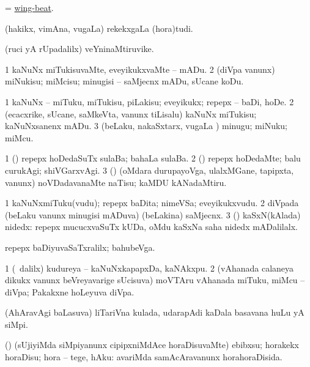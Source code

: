 \bentry
{}
\gl{\nA}
\bmng
= \hyperlink{wing-beat}{wing-beat}. 
\emng
\eentry

\bentry
{}
\gl{\nA}
\bmng
(hakikx, vimAna, \mo vugaLa) rekekxgaLa (hora)tudi. 
\emng
\eentry

\bentry
{}
\gl{\nA}
\bmng
(ruci yA rUpadalilx) veYninaMtiruvike. 
\emng
\eentry

\bentry
{} 
\gl{\sakirx}
\expl{}
\bmng
\bnum
\num{1} kaNuNx miTukisuvaMte, eveyikukxvaMte -- mADu. 
\num{2} (diVpa \mo vanunx) miNukisu; miMcisu; minugisi -- saMjecnx mADu, sUcane koDu. 
\enum
\emng

\noindent
\gl{\akirx}
\expl{}
\bmng
\bnum
\num{1} kaNuNx -- miTuku, miTukisu, piLakisu; eveyikukx; repepx -- baDi, hoDe. 
\num{2} (ecacxrike, sUcane, saMkeVta, \mo vanunx tiLisalu) kaNuNx miTukisu; kaNuNxsanenx mADu. 
\num{3} (beLaku, nakaSxtarx, \mo vugaLa \vi) minugu; miNuku; miMcu. 
\enum
\emng

\noindent
\gl{\pagu}
\expl{}
\bmng
\bnum
\num{1}  (\AmA) repepx hoDedaSuTx sulaBa; bahaLa sulaBa. 
\num{2}  (\ashi) repepx hoDedaMte; balu curukAgi; shiVGarxvAgi. 
\num{3}  (\rUpa) (oMdara durupayoVga, ulalxMGane, tapipxta, \mo vanunx) noVDadavanaMte naTisu; kaMDU kANadaMtiru. 
\enum
\emng
\eentry

\bentry
{}
\gl{\nA}
\expl{}
\bmng
\bnum
\num{1} kaNuNxmiTuku(vudu); repepx baDita; nimeVSa; eveyikukxvudu. 
\num{2} diVpada (beLaku \mo vanunx minugisi mADuva) (beLakina) saMjecnx. 
\num{3} (\AmA) kaSxN(kAlada) nidedx:  repepx mucucxvaSuTx kUDa, oMdu kaSxNa saha nidedx mADalilalx. 
\enum
\emng

\noindent
\gl{\pagu}
\bmng
{} repepx baDiyuvaSaTxralilx; bahubeVga. 
\emng
\eentry

\bentry
{}
\gl{\nA}
\bmng
\bnum
\num{1} (\sA\ \bava dalilx) kudureya -- kaNuNxkapapxDa, kaNAkxpu. 
\num{2} (vAhanada calaneya dikukx \mo vanunx beVreyavarige sUcisuva) moVTAru vAhanada miTuku, miMcu -- diVpa; Pakakxne hoLeyuva diVpa. 
\enum
\emng
\eentry

\bentry
{} 
\gl{\nA}
\expl{}
\bmng
(AhAravAgi baLasuva) liTariVna kulada, udarapAdi kaDala basavana huLu yA siMpi. 
\emng
\eentry

\bentry
{} 
\gl{\sakirx}
\bmng
(\birx) (sUjiyiMda siMpiyanunx cipipxniMdAce horaDisuvaMte) ebibxsu; horakekx horaDisu; hora -- tege, hAku:  avariMda samAcAravanunx horahoraDisida. 
\emng
\eentry

